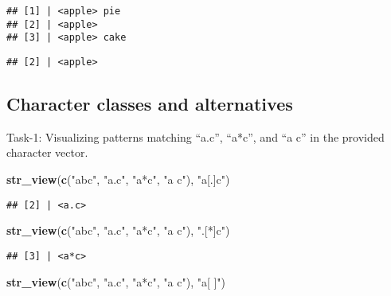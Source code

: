 \documentclass[
]{article}
\newenvironment{Shaded}{\begin{snugshade}}{\end{snugshade}}
\newcommand{\FunctionTok}[1]{\textcolor[rgb]{0.13,0.29,0.53}{\textbf{#1}}}
\newcommand{\NormalTok}[1]{#1}
\newcommand{\StringTok}[1]{\textcolor[rgb]{0.31,0.60,0.02}{#1}}
\begin{document}
\begin{verbatim}
## [1] | <apple> pie
## [2] | <apple>
## [3] | <apple> cake
\end{verbatim}

\begin{Shaded}
\end{Shaded}

\begin{verbatim}
## [2] | <apple>
\end{verbatim}

\hypertarget{character-classes-and-alternatives}{%
\subsection{Character classes and
alternatives}\label{character-classes-and-alternatives}}

Task-1: Visualizing patterns matching ``a.c'', ``a*c'', and ``a c'' in
the provided character vector.

\begin{Shaded}
\begin{Highlighting}[]
\FunctionTok{str\_view}\NormalTok{(}\FunctionTok{c}\NormalTok{(}\StringTok{"abc"}\NormalTok{, }\StringTok{"a.c"}\NormalTok{, }\StringTok{"a*c"}\NormalTok{, }\StringTok{"a c"}\NormalTok{), }\StringTok{"a[.]c"}\NormalTok{)}
\end{Highlighting}
\end{Shaded}

\begin{verbatim}
## [2] | <a.c>
\end{verbatim}

\begin{Shaded}
\begin{Highlighting}[]
\FunctionTok{str\_view}\NormalTok{(}\FunctionTok{c}\NormalTok{(}\StringTok{"abc"}\NormalTok{, }\StringTok{"a.c"}\NormalTok{, }\StringTok{"a*c"}\NormalTok{, }\StringTok{"a c"}\NormalTok{), }\StringTok{".[*]c"}\NormalTok{)}
\end{Highlighting}
\end{Shaded}

\begin{verbatim}
## [3] | <a*c>
\end{verbatim}

\begin{Shaded}
\begin{Highlighting}[]
\FunctionTok{str\_view}\NormalTok{(}\FunctionTok{c}\NormalTok{(}\StringTok{"abc"}\NormalTok{, }\StringTok{"a.c"}\NormalTok{, }\StringTok{"a*c"}\NormalTok{, }\StringTok{"a c"}\NormalTok{), }\StringTok{"a[ ]"}\NormalTok{)}
\end{Highlighting}
\end{Shaded}
\end{document}

